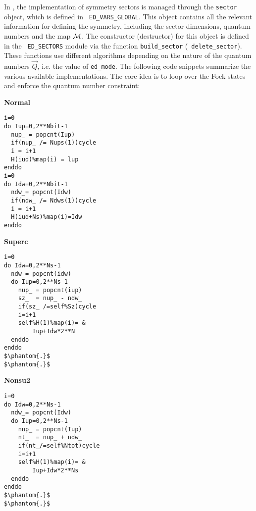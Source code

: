 \documentclass[edipack_sp.tex]{subfiles}
\begin{document}
In \NAME, the implementation of symmetry sectors is managed through the
{\tt sector} object, which is defined in {\tt
  ED\_VARS\_GLOBAL}. This object contains all the relevant
information for defining the symmetry, including the sector
dimensions, quantum numbers and the map ${\cal M}$. The constructor
(destructor) for this object is defined in the {\tt
  ED\_SECTORS} module via the function {\tt build\_sector} ({\tt
  delete\_sector}).
These functions use different algorithms depending on the nature 
of the quantum numbers $\vec{Q}$, i.e. the value of {\tt ed\_mode}. The following code snippets summarize the various available implementations. The core idea is to loop over the Fock states and  enforce the quantum number constraint:
\begin{center}
\begin{minipage}[t]{0.32\linewidth}
\textbf{Normal}
\begin{lstlisting}[style=fstyle,frame=leftline,numbers=none,basicstyle={\ttfamily\scriptsize}]
i=0
do Iup=0,2**Nbit-1     
  nup_ = popcnt(Iup) 
  if(nup_ /= Nups(1))cycle
  i = i+1
  H(iud)%map(i) = lup
enddo
i=0
do Idw=0,2**Nbit-1
  ndw_= popcnt(Idw)
  if(ndw_ /= Ndws(1))cycle
  i = i+1
  H(iud+Ns)%map(i)=Idw
enddo
\end{lstlisting}
\end{minipage}
%
\begin{minipage}[t]{0.32\linewidth}
\textbf{Superc}
\begin{lstlisting}[style=fstyle,frame=leftline,numbers=none,basicstyle={\ttfamily\scriptsize}]
i=0
do Idw=0,2**Ns-1
  ndw_= popcnt(idw)
  do Iup=0,2**Ns-1
    nup_ = popcnt(iup)
    sz_  = nup_ - ndw_
    if(sz_ /=self%Sz)cycle
    i=i+1
    self%H(1)%map(i)= &
        Iup+Idw*2**N
  enddo
enddo
$\phantom{.}$
$\phantom{.}$
\end{lstlisting}
\end{minipage}
%
\begin{minipage}[t]{0.32\linewidth}
\textbf{Nonsu2}
\begin{lstlisting}[style=fstyle,frame=leftline,numbers=none,basicstyle={\ttfamily\scriptsize}]
i=0
do Idw=0,2**Ns-1
  ndw_= popcnt(Idw)
  do Iup=0,2**Ns-1
    nup_ = popcnt(Iup)
    nt_  = nup_ + ndw_
    if(nt_/=self%Ntot)cycle
    i=i+1
    self%H(1)%map(i)= &
        Iup+Idw*2**Ns
  enddo
enddo
$\phantom{.}$
$\phantom{.}$
\end{lstlisting}
\end{minipage}
\end{center}

   
\end{document}
